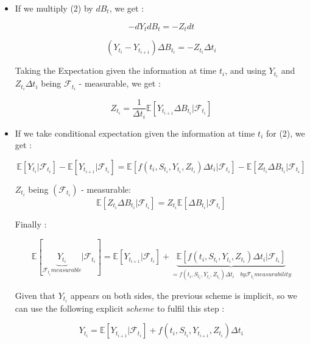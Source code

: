 \begin{itemize}
	\item 
If we multiply (2) by $dB_t$, we get : 

\begin{displaymath}
- dY_tdB_t = - Z_tdt 
\end{displaymath}


\begin{displaymath}
(Y_{t_i} - Y_{t_{i + 1}}) \Delta B_{t_i} =- Z_{t_i}\Delta t_i
\end{displaymath}

Taking the Expectation given the information at time $t_i$, and using  
$Y_{t_i}$ and $Z_{t_i}\Delta t_i$ being $\mathcal{F}_{t_i}$ - measurable, 
we get : 

\begin{displaymath}
Z_{t_i} = \frac{1}{\Delta t_i}\mathbb{E}[Y_{t_{i + 1}} \Delta B_{t_i}  | \mathcal{F}_{t_i}]
\end{displaymath}


\item 

If we take conditional expectation given the information at time $t_i$ for (2), we get : 

\begin{displaymath}
\mathbb{E}[Y_{t_i}| \mathcal{F}_{t_i}] - \mathbb{E}[Y_{t_{i + 1}} | \mathcal{F}_{t_i}] = \mathbb{E}[f(t_i,S_{t_i}, Y_{t_i}, Z_{t_i})\Delta t_i| \mathcal{F}_{t_i}] -\mathbb{E}[Z_{t_i}\Delta B_{t_i}| \mathcal{F}_{t_i}]
\end{displaymath}

$Z_{t_i}$ being $(\mathcal{F}_{t_i})$ - measurable: 
\begin{displaymath}
\mathbb{E}[Z_{t_i}\Delta B_{t_i}| \mathcal{F}_{t_i}] = Z_{t_i}\mathbb{E}[\Delta B_{t_i}| \mathcal{F}_{t_i}]
\end{displaymath}

Finally : 

\begin{displaymath}
\mathbb{E}[\underbrace{Y_{t_i}}_{\mathcal{F}_{t_i} measurable}| \mathcal{F}_{t_i}] = \mathbb{E}[Y_{t_{i + 1}} | \mathcal{F}_{t_i}] +  \underbrace{\mathbb{E}[f(t_i,S_{t_i}, Y_{t_i}, Z_{t_i})\Delta t_i| \mathcal{F}_{t_i}]}_{= f(t_i,S_{t_i}, Y_{t_i}, Z_{t_i})\Delta t_i \quad by \mathcal{F}_{t_i} measurability}
\end{displaymath}

Given that $Y_{t_i}$ appears on both sides, the previous scheme is implicit, so we can use the following explicit $scheme$ to fulfil this step : 

\begin{displaymath}
Y_{t_i} = \mathbb{E}[Y_{t_{i + 1}} | \mathcal{F}_{t_i}] +  f(t_i,S_{t_i}, Y_{t_{i + 1}}, Z_{t_i})\Delta t_i
\end{displaymath}

\end{itemize}

